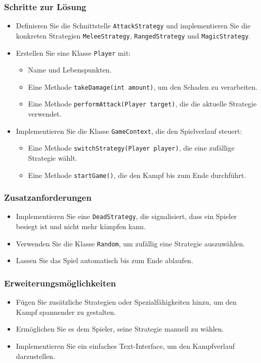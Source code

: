 \begin{frame}
    \frametitle{Schritte zur Lösung}
    \begin{itemize}
        \item Definieren Sie die Schnittstelle \texttt{AttackStrategy} und implementieren Sie die konkreten Strategien \texttt{MeleeStrategy}, \texttt{RangedStrategy} und \texttt{MagicStrategy}.
        \item Erstellen Sie eine Klasse \texttt{Player} mit:
        \begin{itemize}
            \item Name und Lebenspunkten.
            \item Eine Methode \texttt{takeDamage(int amount)}, um den Schaden zu verarbeiten.
            \item Eine Methode \texttt{performAttack(Player target)}, die die aktuelle Strategie verwendet.
        \end{itemize}
        \item Implementieren Sie die Klasse \texttt{GameContext}, die den Spielverlauf steuert:
        \begin{itemize}
            \item Eine Methode \texttt{switchStrategy(Player player)}, die eine zufällige Strategie wählt.
            \item Eine Methode \texttt{startGame()}, die den Kampf bis zum Ende durchführt.
        \end{itemize}
    \end{itemize}
\end{frame}

\begin{frame}
    \frametitle{Zusatzanforderungen}
    \begin{itemize}
        \item Implementieren Sie eine \texttt{DeadStrategy}, die signalisiert, dass ein Spieler besiegt ist und nicht mehr kämpfen kann.
        \item Verwenden Sie die Klasse \texttt{Random}, um zufällig eine Strategie auszuwählen.
        \item Lassen Sie das Spiel automatisch bis zum Ende ablaufen.
    \end{itemize}
\end{frame}

\begin{frame}
    \frametitle{Erweiterungsmöglichkeiten}
    \begin{itemize}
        \item Fügen Sie zusätzliche Strategien oder Spezialfähigkeiten hinzu, um den Kampf spannender zu gestalten.
        \item Ermöglichen Sie es dem Spieler, seine Strategie manuell zu wählen.
        \item Implementieren Sie ein einfaches Text-Interface, um den Kampfverlauf darzustellen.
    \end{itemize}
\end{frame}


